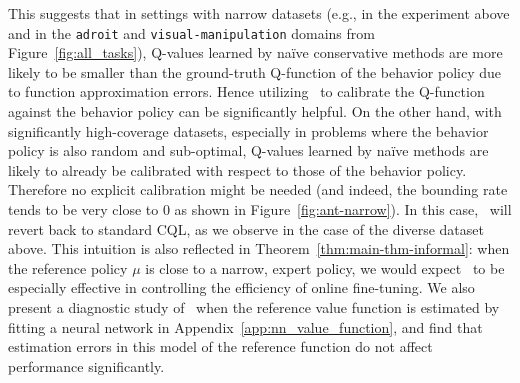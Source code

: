 This suggests that in settings with narrow datasets (e.g., in the experiment above and in the \texttt{adroit} and \texttt{visual-manipulation} domains from Figure~\ref{fig:all_tasks}), Q-values learned by na\"ive conservative methods are more likely to be smaller than the ground-truth Q-function of the behavior policy due to function approximation errors. Hence utilizing \methodname\ to calibrate the Q-function against the behavior policy can be significantly helpful. On the other hand, with significantly high-coverage datasets, especially in problems where the behavior policy is also random and sub-optimal, Q-values learned by na\"ive methods are likely to already be calibrated with respect to those of the behavior policy. Therefore no explicit calibration might be needed (and indeed, the bounding rate tends to be very close to 0 as shown in Figure~\ref{fig:ant-narrow}). In this case, \methodname\ will revert back to standard CQL, as we observe in the case of the diverse dataset above. This intuition is also reflected in Theorem~\ref{thm:main-thm-informal}: when the reference policy $\mu$ is close to a narrow, expert policy, we would expect \methodname\ to be especially effective in controlling the efficiency of online fine-tuning. {We also present a diagnostic study of \methodname\ when the reference value function is estimated by fitting a neural network in Appendix~\ref{app:nn_value_function}}, and find that estimation errors in this model of the reference function do not affect performance significantly. 




\vspace{-0.2cm}